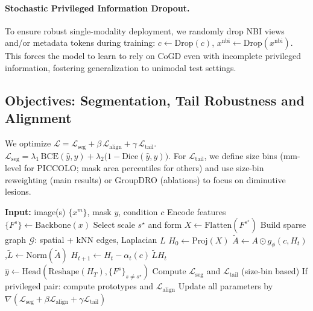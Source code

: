 \documentclass{article}
\begin{document}
\paragraph{Stochastic Privileged Information Dropout.}
To ensure robust single-modality deployment, we randomly drop NBI views and/or metadata tokens during training: $c \leftarrow \mathrm{Drop}(c)$, $x^{\mathrm{nbi}}\leftarrow \mathrm{Drop}(x^{\mathrm{nbi}})$. This forces the model to learn to rely on CoGD even with incomplete privileged information, fostering generalization to unimodal test settings.

\subsection{Objectives: Segmentation, Tail Robustness and Alignment}
We optimize $\mathcal{L} = \mathcal{L}_{\mathrm{seg}} + \beta\,\mathcal{L}_{\mathrm{align}} + \gamma\,\mathcal{L}_{\mathrm{tail}}$.
$\mathcal{L}_{\mathrm{seg}} = \lambda_1\,\mathrm{BCE}(\hat{y},y) + \lambda_2\big(1-\mathrm{Dice}(\hat{y},y)\big)$.
For $\mathcal{L}_{\mathrm{tail}}$, we define size bins (mm-level for PICCOLO; mask area percentiles for others) and use size-bin reweighting (main results) or GroupDRO \cite{Sagawa2020GroupDRO} (ablations) to focus on diminutive lesions.

\begin{algorithm}[t]
\caption{CoGD-Net Training (Train-MM / Test-UM)}
\label{alg:training}
\begin{algorithmic}[1]
\STATE \textbf{Input:} image(s) $\{x^m\}$, mask $y$, condition $c$
\STATE Encode features $\{F^s\}\leftarrow \mathrm{Backbone}(x)$
\STATE Select scale $s^\star$ and form $X\leftarrow\mathrm{Flatten}(F^{s^\star})$
\STATE Build sparse graph $\mathcal{G}$: spatial + kNN edges, Laplacian $L$
\STATE $H_0 \leftarrow \mathrm{Proj}(X)$
  \STATE $\widetilde{A} \leftarrow A \odot g_\phi(c,H_t)$,\quad $\widetilde{L}\leftarrow\mathrm{Norm}(\widetilde{A})$
  \STATE $H_{t+1} \leftarrow H_t - \alpha_t(c)\,\widetilde{L} H_t$
\ENDFOR
\STATE $\hat{y}\leftarrow \mathrm{Head}(\mathrm{Reshape}(H_T),\{F^{s}\}_{s\neq s^\star})$
\STATE Compute $\mathcal{L}_{\mathrm{seg}}$ and $\mathcal{L}_{\mathrm{tail}}$ (size-bin based)
\STATE If privileged pair: compute prototypes and $\mathcal{L}_{\mathrm{align}}$
\STATE Update all parameters by $\nabla(\mathcal{L}_{\mathrm{seg}}+\beta\mathcal{L}_{\mathrm{align}}+\gamma\mathcal{L}_{\mathrm{tail}})$
\end{algorithmic}
\end{algorithm}
\end{document}
